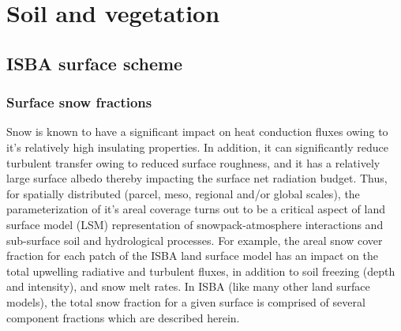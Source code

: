 
\chapter{Soil and vegetation}
\minitoc


\section{ISBA surface scheme}


\subsection{Surface snow fractions}

Snow is known to have a significant impact on heat conduction fluxes owing to it’s relatively high
insulating properties. In addition, it can significantly reduce turbulent transfer owing to reduced
surface roughness, and it has a relatively large surface albedo
thereby impacting the surface net radiation budget. Thus, for
spatially distributed (parcel, meso, regional and/or global scales), 
the parameterization of it’s areal coverage turns out to be a critical
aspect of land surface model (LSM) representation
of snowpack-atmosphere interactions and sub-surface soil and
hydrological processes.
%
For example, the areal snow cover fraction for each patch
of the ISBA land surface model has an impact
on the total upwelling radiative and turbulent fluxes, in addition to
soil freezing (depth and intensity), and snow melt rates. 
%
In ISBA (like many other land surface models), the total snow fraction
for a given surface is comprised of several component fractions which
are described herein.

